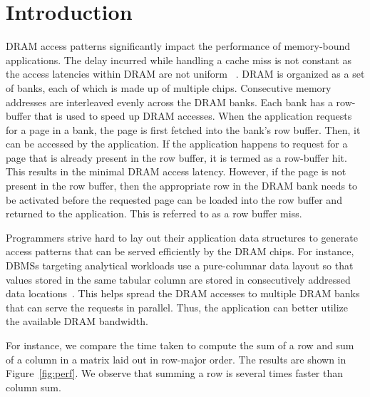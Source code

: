\documentclass[letterpaper]{article}
\begin{document}
\section{Introduction}

DRAM access patterns significantly impact the performance of memory-bound
applications. The delay incurred while handling a cache miss is not
constant as the access latencies within DRAM are not uniform ~\cite{dram1}.
DRAM is organized as a set of banks, each of which is made up of multiple
chips. Consecutive memory addresses are interleaved evenly across the
DRAM banks. Each bank has a row-buffer that is used to speed up DRAM
accesses. When the application requests for a page in a bank, the page
is first fetched into the bank's row buffer. Then, it can be accessed by
the application. If the application happens to request for a page that
is already present in the row buffer, it is termed as a row-buffer hit.
This results in the minimal DRAM access latency. However, if the page
is not present in the row buffer, then the appropriate row in the DRAM
bank needs to be activated before the requested page can be loaded into 
the row buffer and returned to the application. This is referred to as a row
buffer miss.

Programmers strive hard to lay out their application data structures 
to generate access patterns that can be served efficiently by the DRAM chips. 
For instance, DBMSs targeting analytical workloads use a pure-columnar 
data layout so that values stored in the same tabular column are stored 
in consecutively addressed data locations~\cite{col1,raman13,ailamaki02}. This
helps spread the DRAM accesses to multiple DRAM banks that can serve the requests in
parallel. Thus, the application can better utilize the available DRAM
bandwidth.

For instance, we compare the time taken to compute the sum of a row and sum of a
column in a matrix laid out in row-major order. 
The results are shown in Figure~\ref{fig:perf}. We observe that summing a row is several times 
faster than column sum.
\end{document}
